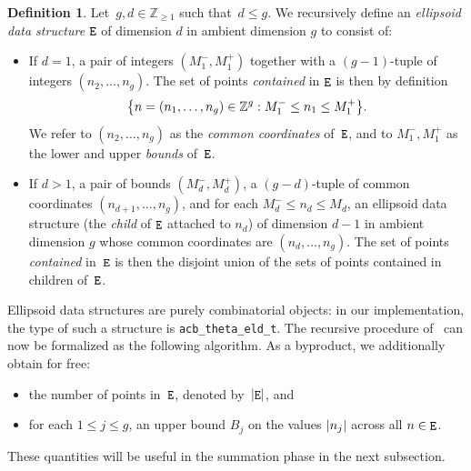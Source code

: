\documentclass[12pt,oneside]{amsart}
\numberwithin{equation}{section}
\theoremstyle{definition}
\newtheorem{defn}[equation]{Definition}
\newcommand{\Z}{\mathbb{Z}}
\DeclareMathOperator{\E}{\tt E}
\DeclarePairedDelimiter{\abs}{|}{|}
\DeclarePairedDelimiter{\braces}{\{}{\}}
\begin{document}
\begin{defn}
  \label{def:eld}
  Let~$g,d\in \Z_{\geq 1}$ such that~$d\leq g$. We recursively define an
  \emph{ellipsoid data structure} $\E$ of dimension $d$ in ambient dimension $g$
  to consist of:
  \begin{itemize}
  \item If $d=1$, a pair of integers $(M_1^-,M_1^+)$ together with a
    $(g-1)$-tuple of integers $(n_2,\ldots, n_g)$. The set of points
    \emph{contained} in $\E$ is then by definition
    \begin{displaymath}
      \braces[\big]{n = (n_1,\ldots,n_g)\in \Z^g: M_1^-\leq n_1\leq M_1^+}.
    \end{displaymath}
    We refer to $(n_2,\ldots, n_g)$ as the \emph{common coordinates} of~$\E$,
    and to $M_1^-, M_1^+$ as the lower and upper \emph{bounds} of~$\E$.
  \item If $d> 1$, a pair of bounds $(M_d^-, M_d^+)$, a $(g-d)$-tuple of common
    coordinates $(n_{d+1}, \ldots, n_g)$, and for each $M_d^-\leq n_d\leq M_d$,
    an ellipsoid data structure (the \emph{child} of $\E$ attached to $n_d$) of
    dimension $d-1$ in ambient dimension $g$ whose common coordinates are
    $(n_d,\ldots,n_g)$. The set of points \emph{contained} in~$\E$ is then the
    disjoint union of the sets of points contained in children of~$\E$.
  \end{itemize}
\end{defn}

Ellipsoid data structures are purely combinatorial objects: in our
implementation, the type of such a structure is
\texttt{acb\_theta\_eld\_t}. The recursive procedure of~\cite[Remark
p.\,9]{deconinckComputingRiemannTheta2004} can now be formalized as the
following algorithm.  As a byproduct, we additionally obtain for free:
\begin{itemize}
\item the number of points in~$\E$, denoted by~$\abs{\E}$, and
\item for each $1\leq j\leq g$, an upper bound $B_j$ on the values $\abs{n_j}$
  across all $n\in \E$.
\end{itemize}
These quantities will be useful in the summation phase in the next subsection.
\end{document}
